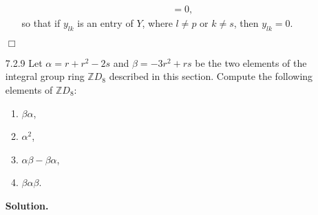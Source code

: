 \documentclass[9pt]{article}
\newcommand{\qed}{\hfill \ensuremath{\Box}}
\newcommand{\Z}{\mathbb{Z}}
\begin{document}
\begin{enumerate}
\begin{enumerate}
\begin{align*}
                     &= 0,
               \end{align*}
               so that if $y_{lk}$ is an entry of $Y$, where $l \neq p$ or
               $k \neq s$, then $y_{lk} = 0$.
      \end{enumerate} \qed
   \item[7.2.9]   Let $\alpha = r + r^2 - 2s$ and $\beta = -3r^2 + rs$ be the
                  two elements of the integral group ring $\Z D_8$ described in
                  this section. Compute the following elements of $\Z D_8$:
                  \begin{enumerate}
                     \item $\beta\alpha$,
                     \item $\alpha^2$,
                     \item $\alpha\beta - \beta\alpha$,
                     \item $\beta\alpha\beta$.
                  \end{enumerate}

      \textbf{Solution.}


\end{enumerate}
\end{document}
